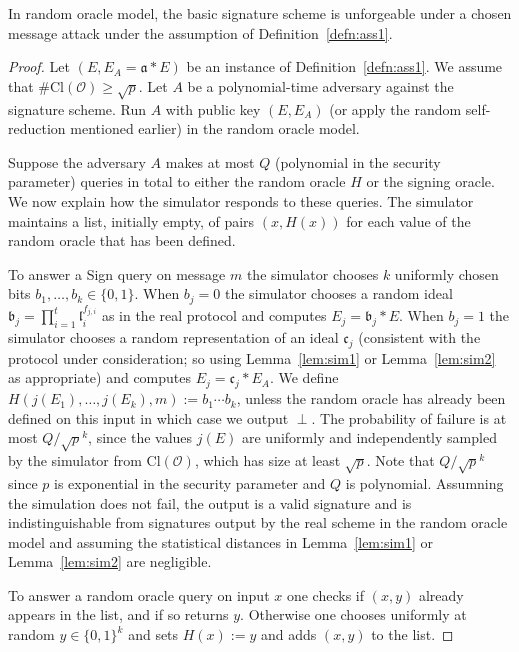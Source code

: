 \documentclass{llncs}
\newcommand{\OO}{\mathcal{O}}
\newcommand{\Cl}{\text{Cl}}
\renewcommand{\a}{\mathfrak{a}}
\renewcommand{\b}{\mathfrak{b}}
\renewcommand{\c}{\mathfrak{c}}
\renewcommand{\l}{\mathfrak{l}}
\begin{document}
\begin{theorem}
In random oracle model, the basic signature scheme is unforgeable under a chosen message attack under the assumption of Definition~\ref{defn:ass1}.
\end{theorem}

\begin{proof}
Let $(E, E_A = \a * E )$ be an instance of Definition~\ref{defn:ass1}.
We assume that $\#\Cl(\OO) \ge \sqrt{p}$.
Let $A$ be a polynomial-time adversary against the signature scheme.
Run $A$ with public key $(E, E_A)$ (or apply the random self-reduction mentioned earlier) in the random oracle model.

Suppose the adversary $A$ makes at most $Q$ (polynomial in the security parameter) queries in total to either the random oracle $H$ or the signing oracle. We now explain how the simulator responds to these queries. The simulator maintains a list, initially empty, of pairs $(x, H(x))$ for each value of the random oracle that has been defined.

To answer a Sign query on message $m$ the simulator chooses 
$k$ uniformly chosen bits $b_1, \dots, b_k \in \{0,1\}$.
When $b_j = 0$ the simulator chooses a random ideal $\b_j = \prod_{i=1}^t \l_i^{f_{j,i}}$ as in the real protocol and computes $E_j = \b_j * E$.
When $b_j = 1$ the simulator chooses a random representation of an ideal $\c_j$ (consistent with the protocol under consideration; so using Lemma~\ref{lem:sim1} or Lemma~\ref{lem:sim2} as appropriate) and computes $E_j = \c_j * E_A$.
We define $H( j( E_1), \dots, j(E_k), m ) := b_1 \cdots b_k$, unless the random oracle has already been defined on this input in which case we output $\perp$.
The probability of failure is at most $Q/\sqrt{p}^k$, since the values $j(E)$ are uniformly and independently sampled by the simulator from $\Cl(\OO)$, which has size at least $\sqrt{p}$.
Note that $Q/\sqrt{p}^k$ since $p$ is exponential in the security parameter and $Q$ is polynomial.
Assumning the simulation does not fail, the output is a valid signature and is indistinguishable from signatures output by the real scheme in the random oracle model and assuming the statistical distances in Lemma~\ref{lem:sim1} or Lemma~\ref{lem:sim2} are negligible.

To answer a random oracle query on input $x$ one checks if $(x,y)$ already appears in the list, and if so returns $y$. Otherwise one chooses uniformly at random $y \in \{0,1\}^k$ and sets $H(x) := y$ and adds $(x,y)$ to the list.


\end{proof}
\end{document}

